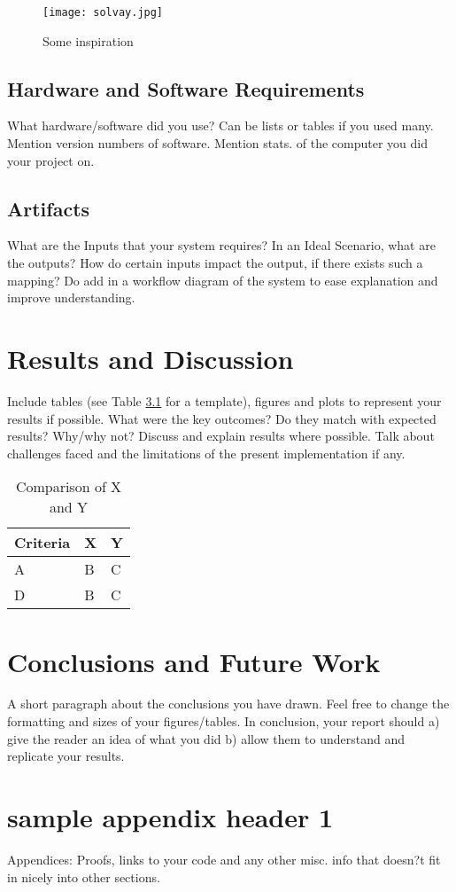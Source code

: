 \documentclass[12pt]{report}
\begin{document}
\begin{figure}[ht]
  \texttt{[image: solvay.jpg]}
  \caption{Some inspiration}
  \label{solvay}
\end{figure}

\section{Hardware and Software Requirements}
What hardware/software did you use? Can be lists or tables if you used many. Mention version numbers of software. Mention stats. of the computer you did your project on. 
\section{Artifacts}
What are the Inputs that your system requires? In an Ideal Scenario, what are the outputs? How do certain inputs impact the output, if there exists such a mapping? Do add in a workflow diagram of the system to ease explanation and improve understanding. 

\chapter{Results and Discussion}
Include tables (see Table \ref{XYComparison} for a template), figures and plots to represent your results if possible. What were the key outcomes? Do they match with expected results? Why/why not? Discuss and explain results where possible. Talk about challenges faced and the limitations of the present implementation if any. 
\begin{table}[ht]
\label{XYComparison}
\begin{center}
\begin{tabular} {l|l|l} %
\hline
\hline
\textbf{Criteria} & \textbf{X} & \textbf{Y}  \\
\hline
A & B & C \\
D & B & C \\
\hline 
\hline
\end{tabular}
\end{center}
\caption{Comparison of  X and Y}
\end{table}

\chapter{Conclusions and Future Work}
A short paragraph about the conclusions you have drawn. Feel free to change the formatting and sizes of your figures/tables. In conclusion, your report should a) give the reader an idea of what you did b) allow them to understand and replicate your results.


 

\appendix 
\chapter{sample appendix header 1}
Appendices: 
Proofs, links to your code and any other misc. info that doesn?t fit in nicely into other sections. 
\end{document}
